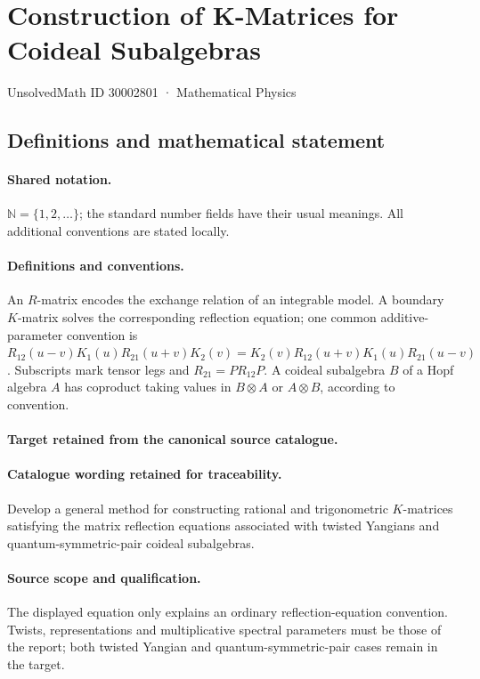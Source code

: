 \documentclass[11pt]{article}
\begin{document}
\setcounter{section}{30002800}
\section{Construction of K-Matrices for Coideal Subalgebras}\label{30002801}
{\small UnsolvedMath ID 30002801 · Mathematical Physics}
\subsection{Definitions and mathematical statement}

\paragraph{Shared notation.}$\mathbb N=\{1,2,\ldots\}$; the standard number fields have their usual meanings. All additional conventions are stated locally.


\paragraph{Definitions and conventions.}
An $R$-matrix encodes the exchange relation of an integrable model. A boundary $K$-matrix solves the corresponding reflection equation; one common additive-parameter convention is $R_{12}(u-v)K_1(u)R_{21}(u+v)K_2(v)=K_2(v)R_{12}(u+v)K_1(u)R_{21}(u-v)$. Subscripts mark tensor legs and $R_{21}=PR_{12}P$. A coideal subalgebra $B$ of a Hopf algebra $A$ has coproduct taking values in $B\otimes A$ or $A\otimes B$, according to convention.

\paragraph{Target retained from the canonical source catalogue.}
\paragraph{Catalogue wording retained for traceability.}
Develop a general method for constructing rational and trigonometric $K$-matrices satisfying the matrix reflection equations associated with twisted Yangians and quantum-symmetric-pair coideal subalgebras.

\paragraph{Source scope and qualification.}
The displayed equation only explains an ordinary reflection-equation convention. Twists, representations and multiplicative spectral parameters must be those of the report; both twisted Yangian and quantum-symmetric-pair cases remain in the target.
\end{document}
